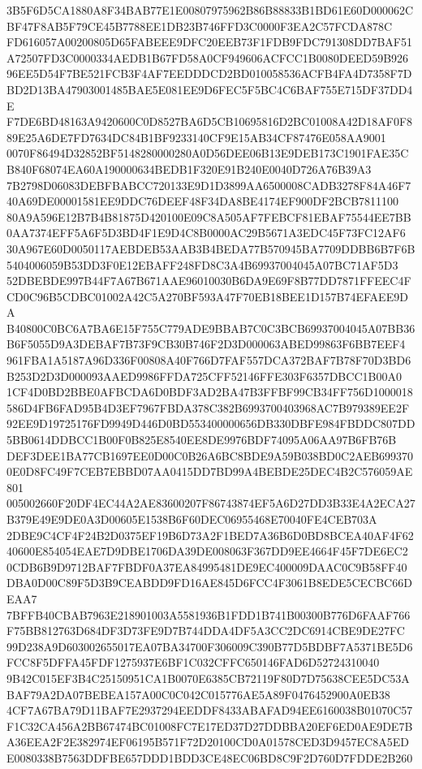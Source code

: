 \documentclass[UTF8,fontset=fandol,zihao=-4,a4paper]{ctexart}
\begin{document}
{{3B5F6D5CA1880A8F34BAB77E1E00807975962B86B88833B1BD61E60D000062CBF47F8AB5F79CE45B7788EE1DB23B746FFD3C0000F3EA2C57FCDA878C
FD616057A00200805D65FABEEE9DFC20EEB73F1FDB9FDC791308DD7BAF51A72507FD3C0000334AEDB1B67FD58A0CF949606ACFCC1B0080DEED59B926
96EE5D54F7BE521FCB3F4AF7EEDDDCD2BD010058536ACFB4FA4D7358F7DBD2D13BA47903001485BAE5E081EE9D6FEC5F5BC4C6BAF755E715DF37DD4E
F7DE6BD48163A9420600C0D8527BA6D5CB10695816D2BC01008A42D18AF0F889E25A6DE7FD7634DC84B1BF9233140CF9E15AB34CF87476E058AA9001
0070F86494D32852BF5148280000280A0D56DEE06B13E9DEB173C1901FAE35CB840F68074EA60A190000634BEDB1F320E91B240E0040D726A76B39A3
7B2798D06083DEBFBABCC720133E9D1D3899AA6500008CADB3278F84A46F740A69DE00001581EE9DDC76DEEF48F34DA8BE4174EF900DF2BCB7811100
80A9A596E12B7B4B81875D420100E09C8A505AF7FEBCF81EBAF75544EE7BB0AA7374EFF5A6F5D3BD4F1E9D4C8B0000AC29B5671A3EDC45F73FC12AF6
30A967E60D0050117AEBDEB53AAB3B4BEDA77B570945BA7709DDBB6B7F6B5404006059B53DD3F0E12EBAFF248FD8C3A4B69937004045A07BC71AF5D3
52DBEBDE997B44F7A67B671AAE96010030B6DA9E69F8B77DD7871FFEEC4FCD0C96B5CDBC01002A42C5A270BF593A47F70EB18BEE1D157B74EFAEE9DA
B40800C0BC6A7BA6E15F755C779ADE9BBAB7C0C3BCB69937004045A07BB36B6F5055D9A3DEBAF7B73F9CB30B746F2D3D000063ABED99863F6BB7EEF4
961FBA1A5187A96D336F00808A40F766D7FAF557DCA372BAF7B78F70D3BD6B253D2D3D000093AAED9986FFDA725CFF52146FFE303F6357DBCC1B00A0
1CF4D0BD2BBE0AFBCDA6D0BDF3AD2BA47B3FFBF99CB34FF756D1000018586D4FB6FAD95B4D3EF7967FBDA378C382B6993700403968AC7B979389EE2F
92EE9D19725176FD9949D446D0BD553400000656DB330DBFE984FBDDC807DD5BB0614DDBCC1B00F0B825E8540EE8DE9976BDF74095A06AA97B6FB76B
DEF3DEE1BA77CB1697EE0D00C0B26A6BC8BDE9A59B038BD0C2AEB6993700E0D8FC49F7CEB7EBBD07AA0415DD7BD99A4BEBDE25DEC4B2C576059AE801
005002660F20DF4EC44A2AE83600207F86743874EF5A6D27DD3B33E4A2ECA27B379E49E9DE0A3D00605E1538B6F60DEC06955468E70040FE4CEB703A
2DBE9C4CF4F24B2D0375EF19B6D73A2F1BED7A36B6D0BD8BCEA40AF4F6240600E854054EAE7D9DBE1706DA39DE008063F367DD9EE4664F45F7DE6EC2
0CDB6B9D9712BAF7FBDF0A37EA84995481DE9EC400009DAAC0C9B58FF40DBA0D00C89F5D3B9CEABDD9FD16AE845D6FCC4F3061B8EDE5CECBC66DEAA7
7BFFB40CBAB7963E218901003A5581936B1FDD1B741B00300B776D6FAAF766F75BB812763D684DF3D73FE9D7B744DDA4DF5A3CC2DC6914CBE9DE27FC
99D238A9D603002655017EA07BA34700F306009C390B77D5BDBF7A5371BE5D6FCC8F5DFFA45FDF1275937E6BF1C032CFFC650146FAD6D52724310040
9B42C015EF3B4C25150951CA1B0070E6385CB72119F80D7D75638CEE5DC53ABAF79A2DA07BEBEA157A00C0C042C015776AE5A89F0476452900A0EB38
4CF7A67BA79D11BAF7E2937294EEDDF8433ABAFAD94EE6160038B01070C57F1C32CA456A2BB67474BC01008FC7E17ED37D27DDBBA20EF6ED0AE9DE7B
A36EEA2F2E382974EF06195B571F72D20100CD0A01578CED3D9457EC8A5EDE0080338B7563DDFBE657DDD1BDD3CE48EC06BD8C9F2D760D7FDDE2B260
}}
\end{document}

